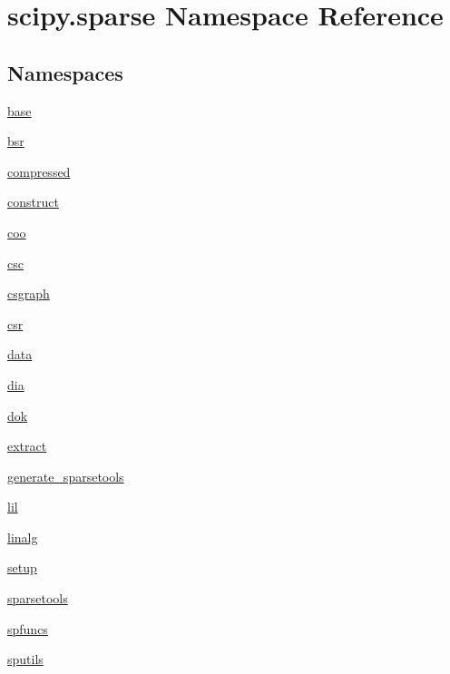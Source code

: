 \hypertarget{namespacescipy_1_1sparse}{}\section{scipy.\+sparse Namespace Reference}
\label{namespacescipy_1_1sparse}
\subsection*{Namespaces}
\begin{DoxyCompactItemize}
\item 
 \hyperlink{namespacescipy_1_1sparse_1_1base}{base}
\item 
 \hyperlink{namespacescipy_1_1sparse_1_1bsr}{bsr}
\item 
 \hyperlink{namespacescipy_1_1sparse_1_1compressed}{compressed}
\item 
 \hyperlink{namespacescipy_1_1sparse_1_1construct}{construct}
\item 
 \hyperlink{namespacescipy_1_1sparse_1_1coo}{coo}
\item 
 \hyperlink{namespacescipy_1_1sparse_1_1csc}{csc}
\item 
 \hyperlink{namespacescipy_1_1sparse_1_1csgraph}{csgraph}
\item 
 \hyperlink{namespacescipy_1_1sparse_1_1csr}{csr}
\item 
 \hyperlink{namespacescipy_1_1sparse_1_1data}{data}
\item 
 \hyperlink{namespacescipy_1_1sparse_1_1dia}{dia}
\item 
 \hyperlink{namespacescipy_1_1sparse_1_1dok}{dok}
\item 
 \hyperlink{namespacescipy_1_1sparse_1_1extract}{extract}
\item 
 \hyperlink{namespacescipy_1_1sparse_1_1generate__sparsetools}{generate\+\_\+sparsetools}
\item 
 \hyperlink{namespacescipy_1_1sparse_1_1lil}{lil}
\item 
 \hyperlink{namespacescipy_1_1sparse_1_1linalg}{linalg}
\item 
 \hyperlink{namespacescipy_1_1sparse_1_1setup}{setup}
\item 
 \hyperlink{namespacescipy_1_1sparse_1_1sparsetools}{sparsetools}
\item 
 \hyperlink{namespacescipy_1_1sparse_1_1spfuncs}{spfuncs}
\item 
 \hyperlink{namespacescipy_1_1sparse_1_1sputils}{sputils}
\end{DoxyCompactItemize}
